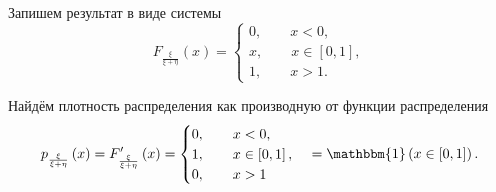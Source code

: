 Запишем результат в виде системы
$$F_{ \frac{ \xi }{ \xi + \eta }} \left( x \right) =
\begin{cases}
0, \qquad x < 0, \\
x, \qquad x \in \left[ 0, 1 \right], \\
1, \qquad x > 1.
\end{cases}$$

Найдём плотность распределения как производную от функции распределения
$$p_{ \frac{ \xi }{ \xi + \eta }} \left( x \right) =
F'_{ \frac{ \xi }{ \xi + \eta }} \left( x \right) =
\begin{cases}
0, \qquad x < 0, \\
1, \qquad x \in \left[ 0, 1 \right], \\
0, \qquad x > 1
\end{cases} =
\mathbbm{1} \left( x \in \left[ 0, 1 \right] \right).$$
